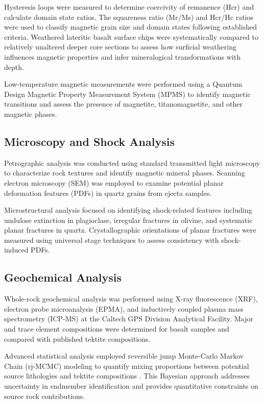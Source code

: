 \documentclass[twocolumn,11pt]{article}
\begin{document}
Hysteresis loops were measured to determine coercivity of remanence (Hcr) and calculate domain state ratios. The squareness ratio (Mr/Ms) and Hcr/Hc ratios were used to classify magnetic grain size and domain states following established criteria. Weathered lateritic basalt surface chips were systematically compared to relatively unaltered deeper core sections to assess how surficial weathering influences magnetic properties and infer mineralogical transformations with depth.

Low-temperature magnetic measurements were performed using a Quantum Design Magnetic Property Measurement System (MPMS) to identify magnetic transitions and assess the presence of magnetite, titanomagnetite, and other magnetic phases.

\subsection{Microscopy and Shock Analysis}

Petrographic analysis was conducted using standard transmitted light microscopy to characterize rock textures and identify magnetic mineral phases. Scanning electron microscopy (SEM) was employed to examine potential planar deformation features (PDFs) in quartz grains from ejecta samples.

Microstructural analysis focused on identifying shock-related features including undulose extinction in plagioclase, irregular fractures in olivine, and systematic planar fractures in quartz. Crystallographic orientations of planar fractures were measured using universal stage techniques to assess consistency with shock-induced PDFs.

\subsection{Geochemical Analysis}

Whole-rock geochemical analysis was performed using X-ray fluorescence (XRF), electron probe microanalysis (EPMA), and inductively coupled plasma mass spectrometry (ICP-MS) at the Caltech GPS Division Analytical Facility. Major and trace element compositions were determined for basalt samples and compared with published tektite compositions.

Advanced statistical analysis employed reversible jump Monte-Carlo Markov Chain (rj-MCMC) modeling to quantify mixing proportions between potential source lithologies and tektite compositions \citep{Gallagher2011}. This Bayesian approach addresses uncertainty in endmember identification and provides quantitative constraints on source rock contributions.
\end{document}
